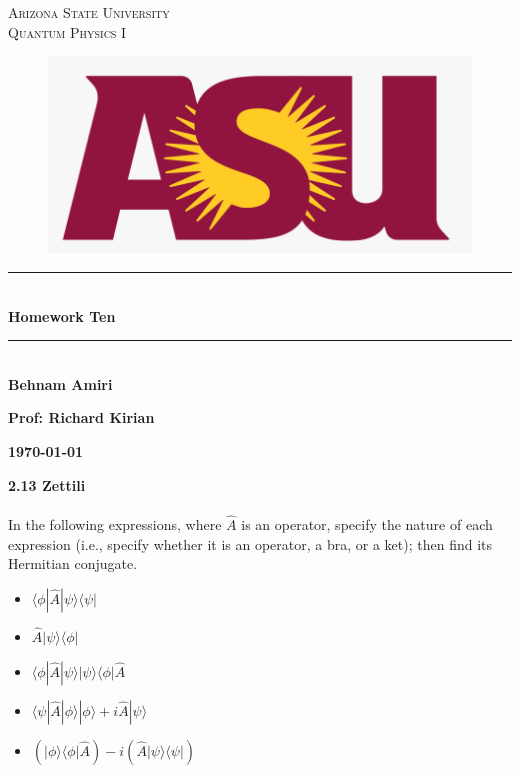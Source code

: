 \documentclass[fleqn]{article}
\begin{document}
  \begin{titlepage}

    \newcommand{\HRule}{\rule{\linewidth}{0.5mm}}

    \center


    \textsc{\LARGE Arizona State University}\\[1.5cm]

    \textsc{\LARGE Quantum Physics I }\\[1.5cm]


    \begin{figure}
      \includegraphics[width=\linewidth]{asu.png}
    \end{figure}


    \HRule \\[0.4cm]
    { \huge \bfseries Homework Ten}\\[0.4cm] 
    \HRule \\[1.5cm]

    \textbf{Behnam Amiri}

    \bigbreak

    \textbf{Prof: Richard Kirian}

    \bigbreak


    \textbf{{\large \today}\\[2cm]}

    \vfill 

  \end{titlepage}


  \textbf{2.13 Zettili} \\ \\
  In the following expressions, where $\hat{A}$ is an operator, specify the nature of each expression 
  (i.e., specify whether it is an operator, a bra, or a ket); then find its Hermitian conjugate.
  \begin{itemize}
    \item $\langle \phi | \hat{A} | \psi \rangle \langle  \psi |$

    \item $\hat{A} | \psi \rangle \langle \phi |$
    
    \item $\langle \phi | \hat{A} | \psi \rangle | \psi \rangle \langle \phi | \hat{A}$
    
    \item $\langle \psi | \hat{A} | \phi \rangle | \phi \rangle + i \hat{A} | \psi \rangle$
    
    \item $\left(| \phi \rangle  \langle \phi | \hat{A} \right)-i\left(\hat{A} | \psi \rangle \langle \psi |\right)$
  \end{itemize}
\end{document}
